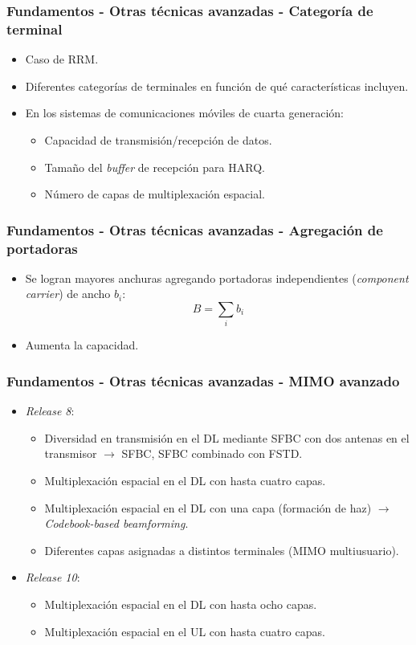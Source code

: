\documentclass{beamer}
\begin{document}
\begin{frame}
\frametitle{Fundamentos - Otras técnicas avanzadas - Categoría de terminal}

\begin{itemize}
\item Caso de RRM.
\item Diferentes categorías de terminales en función de qué características incluyen.
\item {
	En los sistemas de comunicaciones móviles de cuarta generación:
	\begin{itemize}
	\item Capacidad de transmisión/recepción de datos.
	\item Tamaño del \textit{buffer} de recepción para HARQ.
	\item Número de capas de multiplexación espacial.
	\end{itemize}
}
\end{itemize}
\end{frame}

\begin{frame}
\frametitle{Fundamentos - Otras técnicas avanzadas - Agregación de portadoras}

\begin{itemize}
\item Se logran mayores anchuras agregando portadoras independientes (\textit{component carrier}) de ancho $b_i$:
$$B = \sum_i b_i$$
\item Aumenta la capacidad.
\end{itemize}
\end{frame}

\begin{frame}
\frametitle{Fundamentos - Otras técnicas avanzadas - MIMO avanzado}

\begin{itemize}
\item {
	\textit{Release 8}:
	\begin{itemize}
	\item Diversidad en transmisión en el DL mediante SFBC con dos antenas en el transmisor $\rightarrow$ SFBC, SFBC combinado con FSTD.
	\item Multiplexación espacial en el DL con hasta cuatro capas.
	\item Multiplexación espacial en el DL con una capa (formación de haz) $\rightarrow$ \textit{Codebook-based beamforming}.
	\item Diferentes capas asignadas a distintos terminales (MIMO multiusuario).
	\end{itemize}
}
\item {
	\textit{Release 10}:
	\begin{itemize}
	\item Multiplexación espacial en el DL con hasta ocho capas.
	\item Multiplexación espacial en el UL con hasta cuatro capas.
	\end{itemize}
}
\end{itemize}
\end{frame}
\end{document}
